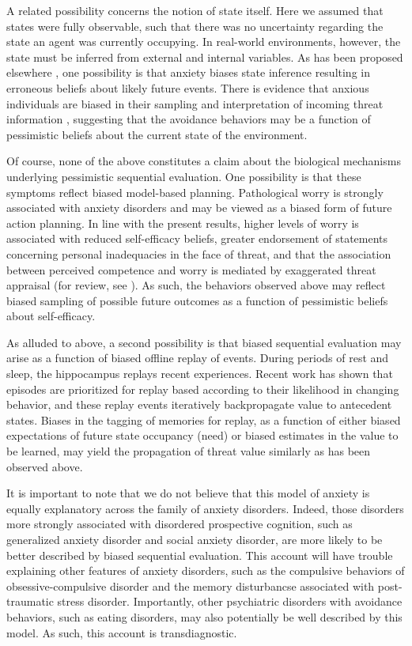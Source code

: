 \documentclass[11pt]{article} %
\begin{document}
A related possibility concerns the notion of state itself. Here we assumed that states were fully observable, such that there was no uncertainty regarding the state an agent was currently occupying. In real-world environments, however, the state must be inferred from external and internal variables. As has been proposed elsewhere \cite{Paulus2012}, one possibility is that anxiety biases state inference resulting in erroneous beliefs about likely future events. There is evidence that anxious individuals are biased in their sampling and interpretation of incoming threat information \cite{Paulus2012}, suggesting that the avoidance behaviors may be a function of pessimistic beliefs about the current state of the environment.  


Of course, none of the above constitutes a claim about the biological mechanisms underlying pessimistic sequential evaluation. One possibility is that these symptoms reflect biased model-based planning. Pathological worry is strongly associated with anxiety disorders and may be viewed as a biased form of future action planning. In line with the present results, higher levels of worry is associated with reduced self-efficacy beliefs, greater endorsement of statements concerning personal inadequacies in the face of threat, and that the association between perceived competence and worry is mediated by exaggerated threat appraisal (for review, see \cite{Berenbaum2010}). As such, the behaviors observed above may reflect biased sampling of possible future outcomes as a function of pessimistic beliefs about self-efficacy. 

As alluded to above, a second possibility is that biased sequential evaluation may arise as a function of biased offline replay of events. During periods of rest and sleep, the hippocampus replays recent experiences. Recent work has shown that episodes are prioritized for replay based according to their likelihood in changing behavior, and these replay events iteratively backpropagate value to antecedent states. Biases in the tagging of memories for replay, as a function of either biased expectations of future state occupancy (need) or biased estimates in the value to be learned, may yield the propagation of threat value similarly as has been observed above. 

It is important to note that we do not believe that this model of anxiety is equally explanatory across the family of anxiety disorders. Indeed, those disorders more strongly associated with disordered prospective cognition, such as generalized anxiety disorder and social anxiety disorder, are more likely to be better described by biased sequential evaluation. This account will have trouble explaining other features of anxiety disorders, such as the compulsive behaviors of obsessive-compulsive disorder and the memory disturbancse associated with post-traumatic stress disorder. Importantly, other psychiatric disorders with avoidance behaviors, such as eating disorders, may also potentially be well described by this model. As such, this account is transdiagnostic.
\end{document}
